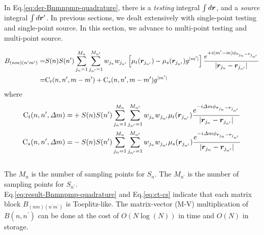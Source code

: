 \documentclass [10pt,letterpaper]{article}
\begin{document}
In Eq.\eqref{eq:der-Bnmnpmp-quadrature}, there is a \emph{testing} integral 
$\int d\vectorsym{r}$, and a \emph{source} integral $\int d\vectorsym{r^\prime}$.
In previous sections, we dealt extensively with single-point testing and single-point source.
In this section, we advance to multi-point testing and multi-point source.

\begin{equation} \label{eq:result-Bnmnpmp-quadrature}
	\begin{split}
		B_{(nm)(n^\prime m^\prime)}
		=& 
			S(n)
			S(n^\prime)
			\sum \limits_{j_n=1}^{M_n}
			\sum \limits_{j_{n^\prime}=1}^{M_{n^\prime}}
			w_{j_n}
			w_{j_{n^\prime}}
			\left[
				\mu_t(\vectorsym{r}_{{j_{n^\prime}}})
				-
				\mu_s(\vectorsym{r}_{{j_{n^\prime}}})
				g^{\lvert m^\prime \rvert}
			\right]
			\frac
			{ e^{+i (m^\prime - m)\phi_{\vectorsym{r}_{j_n}
			-\vectorsym{r}_{{j_{n^\prime}}}}} }
			{\lvert\vectorsym{r}_{j_n}-\vectorsym{r}_{{j_{n^\prime}}}\rvert}
		\\
		=& 
			\text{C}_t(n,n^\prime,m-m^\prime)
			+
			\text{C}_s(n,n^\prime,m-m^\prime)
			g^{\lvert m^\prime \rvert}
	\end{split}
\end{equation}
where
\begin{subequations} \label{eq:ct-cs}
	\begin{align} 
		\text{C}_t(n,n^\prime,\Delta m)
		=&
			+
			S(n)
			S(n^\prime)
			\sum \limits_{j_n=1}^{M_n}
			\sum \limits_{j_{n^\prime}=1}^{M_{n^\prime}}
			w_{j_n}
			w_{j_{n^\prime}}
			\mu_t(\vectorsym{r}_{{j_{n^\prime}}}) 
			\frac
			{ e^{-i \Delta m \phi_{\vectorsym{r}_{j_n}
			-\vectorsym{r}_{{j_{n^\prime}}}}} } 
			{\lvert\vectorsym{r}_{j_n}-\vectorsym{r}_{{j_{n^\prime}}}\rvert}
		\\
		\text{C}_s(n,n^\prime,\Delta m)
		=&
			-
			S(n)
			S(n^\prime)
			\sum \limits_{j_n=1}^{M_n}
			\sum \limits_{j_{n^\prime}=1}^{M_{n^\prime}}
			w_{j_n}
			w_{j_{n^\prime}}
			\mu_s(\vectorsym{r}_{{j_{n^\prime}}})
			\frac
			{ e^{-i \Delta m \phi_{\vectorsym{r}_{j_n}
			-\vectorsym{r}_{{j_{n^\prime}}}}} }
			{\lvert\vectorsym{r}_{j_n}-\vectorsym{r}_{{j_{n^\prime}}}\rvert}
	\end{align}
\end{subequations}
\\
The $M_n$ is the number of sampling points for $S_n$. The $M_{n^\prime}$ is the 
number of sampling points for $S_{n^\prime}$.
\\

Eq.\eqref{eq:result-Bnmnpmp-quadrature} and Eq.\eqref{eq:ct-cs} indicate that
each matrix block $B_{(nm)(n^\prime m^\prime)}$ is Toeplitz-like. The
matrix-vector (M-V) multiplication of $B(n,n^\prime)$ can be done at the cost of
$O(N\log(N))$ in time and $O(N)$ in storage.
\\
\end{document}
